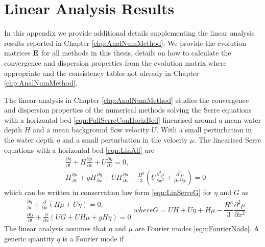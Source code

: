\chapter{Linear Analysis Results}
\label{app:LinAnal}
In this appendix we provide additional details supplementing the linear analysis results reported in Chapter \ref{chp:AnalNumMethod}. We provide the evolution matrices $\mathbf{E}$ for all methods in this thesis, details on how to calculate the convergence and dispersion properties from the evolution matrix where appropriate and the consistency tables not already in Chapter \ref{chp:AnalNumMethod}.  

The linear analysis in Chapter \ref{chp:AnalNumMethod} studies the convergence and dispersion properties of the numerical methods solving the Serre equations with a horizontal bed \eqref{eqn:FullSerreConHorizBed} linearised around a mean water depth $H$ and a mean background flow velocity $U$. With a small perturbation in the water depth $\eta$ and a small perturbation in the velocity $\mu$. The linearised Serre equations with a horizontal bed \eqref{eqn:LinAll} are
\begin{subequations}
	\label{appC:Lin}
	\begin{align}
	&\frac{\partial  \eta}{\partial  t} + H\frac{\partial \mu}{\partial  x} + U\frac{\partial  \eta}{\partial  x}  = 0, \\
	&H\frac{\partial  \mu}{\partial  t} + gH\frac{\partial  \eta}{\partial  x} + UH\frac{\partial  \mu}{\partial  x} - \frac{H^3}{3}\left(U\frac{\partial^3  \mu}{\partial  x^3} + \frac{\partial^3  \mu}{\partial  x^2 \partial  t}  \right)  = 0
	\end{align}	
\end{subequations}
which can be written in conservation law form \eqref{eqn:LinSerreG} for $\eta$ and $G$ as
\begin{subequations}
	\label{appC:ConLawFormLin}
	\begin{align}
	&\frac{\partial  \eta}{\partial  t} +\frac{\partial}{\partial  x} \left(H\mu + U \eta\right) = 0, \\
	&\frac{\partial  G}{\partial  t} + \frac{\partial}{\partial  x}\left(UG + UH\mu + gH \eta\right) = 0
	\end{align}
	where
	\begin{equation}
	G = UH + U \eta + H \mu -\frac{H^3}{3} \frac{\partial^2 \mu }{\partial x^2}.
	\end{equation}
\end{subequations}
The linear analysis assumes that $\eta$ and $\mu$ are Fourier modes \eqref{eqn:FourierNode}. A generic quantity $q$ is a Fourier mode if
